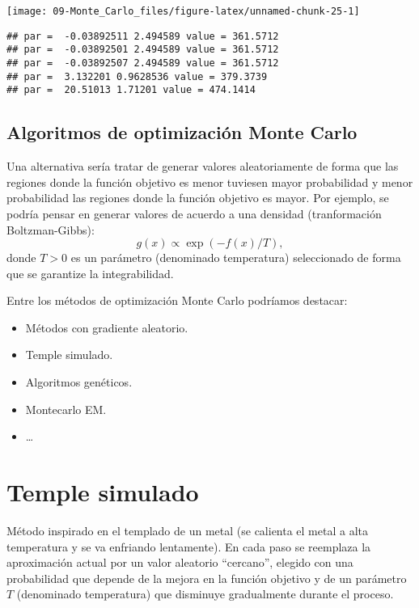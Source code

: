 \documentclass[
]{book}
\theoremstyle{break}
\theoremstyle{definition}
\theoremstyle{definition}
\theoremstyle{definition}
\theoremstyle{remark}
\begin{document}
\begin{center}\texttt{[image: 09-Monte\_Carlo\_files/figure-latex/unnamed-chunk-25-1]} \end{center}

\begin{verbatim}
## par =  -0.03892511 2.494589 value = 361.5712 
## par =  -0.03892501 2.494589 value = 361.5712 
## par =  -0.03892507 2.494589 value = 361.5712 
## par =  3.132201 0.9628536 value = 379.3739 
## par =  20.51013 1.71201 value = 474.1414
\end{verbatim}

\hypertarget{algoritmos-de-optimizaciuxf3n-monte-carlo}{%
\subsection{Algoritmos de optimización Monte Carlo}\label{algoritmos-de-optimizaciuxf3n-monte-carlo}}

Una alternativa sería tratar de generar valores aleatoriamente de
forma que las regiones donde la función objetivo es menor tuviesen
mayor probabilidad y menor probabilidad las regiones donde la
función objetivo es mayor.
Por ejemplo, se podría pensar en generar valores de acuerdo a una
densidad (tranformación
Boltzman-Gibbs):
\[g(x)\propto \exp \left( -f(x)/T\right) ,\]donde
\(T>0\) es un parámetro (denominado temperatura) seleccionado de forma
que se garantize la integrabilidad.

Entre los métodos de optimización Monte Carlo podríamos destacar:

\begin{itemize}
\item
  Métodos con gradiente aleatorio.
\item
  Temple simulado.
\item
  Algoritmos genéticos.
\item
  Montecarlo EM.
\item
  \ldots{}
\end{itemize}

\hypertarget{temple-simulado}{%
\section{Temple simulado}\label{temple-simulado}}

Método inspirado en el templado de un metal (se calienta el metal a
alta temperatura y se va enfriando lentamente).
En cada paso se reemplaza la aproximación actual por un valor
aleatorio ``cercano'', elegido con una probabilidad que depende de la
mejora en la función objetivo y de un parámetro \(T\)
(denominado temperatura) que disminuye gradualmente durante
el proceso.
\end{document}
